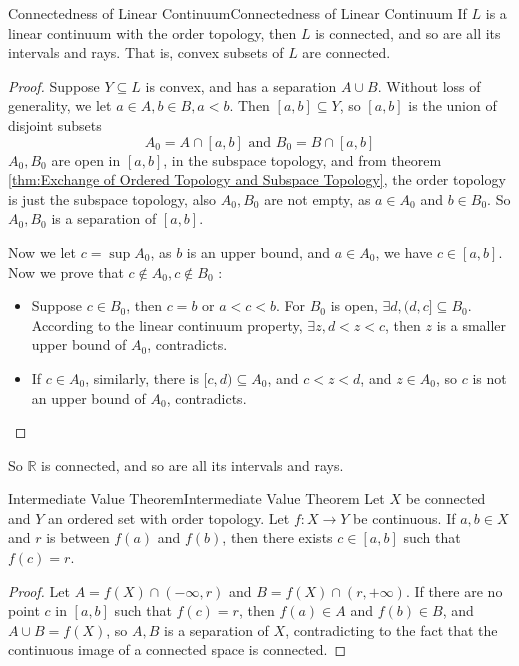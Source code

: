 \documentclass[../main.tex]{subfiles}
\begin{document}
\begin{theorem}{Connectedness of Linear Continuum}{Connectedness of Linear Continuum}
If $L$ is a linear continuum with the order topology, then $L$ is connected, and so are all its intervals and rays. That is, convex subsets of $L$ are connected.
\end{theorem}
\begin{proof}
	Suppose $Y \subseteq L$ is convex, and has a separation $A\cup B$. Without loss of generality, we let $a\in A,b\in B, a<b$. Then $[a,b] \subseteq Y$, so $[a,b]$ is the union of disjoint subsets
	\begin{equation*}
		A_0 = A\cap [a,b] \text{ and } B_0 = B\cap [a,b]
	\end{equation*}
	$A_0,B_0$ are open in $[a,b]$, in the subspace topology, and from theorem \ref{thm:Exchange of Ordered Topology and Subspace Topology}, the order topology is just the subspace topology, also $A_0,B_0$ are not empty, as $a\in A_0$ and $b\in B_0$. So $A_0,B_0$ is a separation of $[a,b]$.

	Now we let $c = \sup A_0$, as $b$ is an upper bound, and $a\in A_0$, we have $c\in [a,b]$. Now we prove that $c\notin A_0,c\notin B_0$ :
	\begin{itemize}
		\item Suppose $c\in B_0$, then $c=b$ or $a<c<b$. For $B_0$ is open, $\exists d, (d,c] \subseteq B_0$. According to the linear continuum property,  $\exists z,d<z<c$, then $z$ is a smaller upper bound of $A_0$, contradicts.
		\item If $c\in A_0$, similarly, there is $[c,d) \subseteq A_0$, and $c<z<d$, and $z\in A_0$, so $c$ is not an upper bound of $A_0$, contradicts.
	\end{itemize}
\end{proof}

So $\mathbb{R}$ is connected, and so are all its intervals and rays.

\begin{theorem}{Intermediate Value Theorem}{Intermediate Value Theorem}
	Let $X$ be connected and $Y$ an ordered set with order topology. Let $f:X \rightarrow Y$ be continuous. If $a,b\in X$ and $r$ is between $f(a)$ and $f(b)$, then there exists $c\in [a,b]$ such that $f(c) = r$.
\end{theorem}
\begin{proof}
	Let $A = f(X)\cap (-\infty ,r)$ and $B = f(X)\cap (r,+\infty )$. If there are no point $c$ in $[a,b]$ such that $f(c) = r$, then $f(a)\in A$ and $f(b)\in B$, and $A\cup B = f(X)$, so $A,B$ is a separation of $X$, contradicting to the fact that the continuous image of a connected space is connected.
\end{proof}
\end{document}
